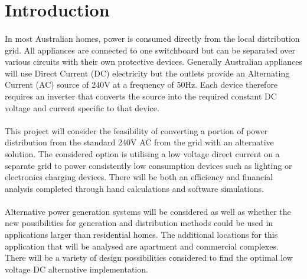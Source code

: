 
\section{Introduction}

\paragraph{} 
In most Australian homes, power is consumed directly from the local distribution grid. All appliances are connected to one switchboard but can be separated over various circuits with their own protective devices. Generally Australian appliances will use Direct Current (DC) electricity but the outlets provide an Alternating Current (AC) source of 240V at a frequency of 50Hz. Each device therefore requires an inverter that converts the source into the required constant DC voltage and current specific to that device. 

\paragraph{} 
This project will consider the feasibility of converting a portion of power distribution from the standard 240V AC from the grid with an alternative solution. The considered option is utilising a low voltage direct current on a separate grid to power consistently low consumption devices such as lighting or electronics charging devices. There will be both an efficiency and financial analysis completed through hand calculations and software simulations.  

\paragraph{} 
Alternative power generation systems will be considered as well as whether the new possibilities for generation and distribution methods could be used in applications larger than residential homes. The additional locations for this application that will be analysed are apartment and commercial complexes. There will be a variety of design possibilities considered to find the optimal low voltage DC alternative implementation.  

\newpage